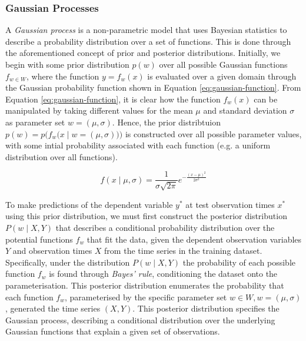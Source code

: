 \documentclass[a4paper, 11pt]{article}
\begin{document}
    \subsubsection{Gaussian Processes}

    A \emph{Gaussian process} is a non-parametric model that uses Bayesian statistics to describe a probability distribution over a set of functions. This is done through the aforementioned concept of prior and posterior distributions. Initially, we begin with some prior distribution $p(w)$ over all possible Gaussian functions $f_{w \in W}$, where the function $y = f_w(x)$ is evaluated over a given domain through the Gaussian probability function shown in Equation \ref{eq:gaussian-function}. From Equation \ref{eq:gaussian-function}, it is clear how the function $f_w(x)$ can be manipulated by taking different values for the mean $\mu$ and standard deviation $\sigma$ as parameter set $w = (\mu, \sigma)$. Hence, the prior distribtuion $p(w) = p\big(f_w \big(x \mid w = \left(\mu, \sigma \right) \big) \big)$ is constructed over all possible parameter values, with some intial probability associated with each function (e.g. a uniform distribution over all functions).

    \begin{equation}
        f \left(x \mid \mu, \sigma \right) = \frac{1}{\sigma \sqrt{2 \pi}} e^{- \frac{\left(x - \mu\right)^2}{2 \sigma^2}}
        \label{eq:gaussian-function}
    \end{equation}

    To make predictions of the dependent variable $y^*$ at test observation times $x^*$ using this prior distribution, we must first construct the posterior distribution $P(w \mid X, Y)$ that describes a conditional probability distribution over the potential functions $f_w$ that fit the data, given the dependent observation variables $Y$ and observation times $X$ from the time series in the training dataset. Specifically, under the distribution $P(w \mid X, Y)$ the probability of each possible function $f_w$ is found through \emph{Bayes’ rule}, conditioning the dataset onto the parameterisation. This posterior distribution enumerates the probability that each function $f_w$, parameterised by the specific parameter set $w \in W, w = (\mu, \sigma)$, generated the time series $(X, Y)$. This posterior distribution specifies the Gaussian process, describing a conditional distribution over the underlying Gaussian functions that explain a given set of observations.
\end{document}
